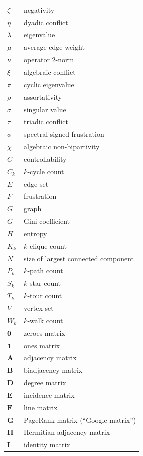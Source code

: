 \documentclass{article}
\begin{document}
\begin{longtable}{ll}
  $\zeta$ & negativity \\
  $\eta$ & dyadic conflict \\
  $\lambda$ & eigenvalue \\
  $\mu$  & average edge weight \\
  $\nu$  & operator 2-norm \\
  $\xi$  & algebraic conflict \\
  $\pi$  & cyclic eigenvalue \\
  $\rho$ & assortativity \\
  $\sigma$ & singular value \\
  $\tau$ & triadic conflict \\
  $\phi$ & spectral signed frustration \\
  $\chi$ & algebraic non-bipartivity \\
  \midrule
  $C$   & controllability \\
  $C_k$ & $k$-cycle count \\
  $E$   & edge set \\
  $F$ & frustration \\
  $G$ & graph \\
  $G$ & Gini coefficient \\
  $H$ & entropy \\
  $K_k$ & $k$-clique count \\
  $N$   & size of largest connected component\\
  $P_k$ & $k$-path count \\
  $S_k$ & $k$-star count \\
  $T_k$ & $k$-tour count \\
  $V$   & vertex set \\
  $W_k$ & $k$-walk count \\
  \midrule
  $\mathbf 0$ & zeroes matrix \\
  $\mathbf 1$ & ones matrix \\
  $\mathbf A$ & adjacency matrix \\
  $\mathbf B$ & biadjacency matrix \\
  $\mathbf D$ & degree matrix \\
  $\mathbf E$ & incidence matrix \\ 
  $\mathbf F$ & line matrix \\
  $\mathbf G$ & PageRank matrix (``Google matrix'') \\
  $\mathbf H$ & Hermitian adjacency matrix \\
  $\mathbf I$ & identity matrix \\

\end{longtable}
\end{document}
